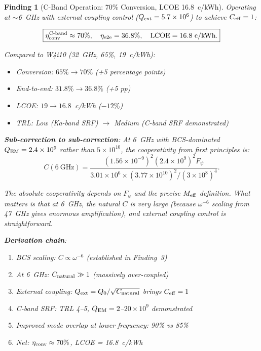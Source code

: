 \documentclass[11pt]{article}
\newtheorem{finding}{Finding}
\newcommand{\ee}[1]{\times 10^{#1}}
\newcommand{\Meff}{M_{\rm eff}}
\newcommand{\QEM}{Q_{\rm EM}}
\newcommand{\Fpsi}{F_\psi}
\begin{document}
\begin{finding}[C-Band Operation: 70\% Conversion, LCOE 16.8~c/kWh]
\label{find:c-band-optimal}
Operating at $\sim$6~GHz with external coupling control ($Q_{\rm ext} =
5.7\ee{6}$) to achieve $C_{\rm eff} = 1$:

\begin{equation}
\boxed{\eta_{\rm conv}^{\rm C\text{-}band} \approx 70\%,
\quad \eta_{\rm e2e} = 36.8\%,
\quad \text{LCOE} = 16.8~\text{c/kWh}.}
\end{equation}

Compared to W4i10 (32~GHz, 65\%, 19~c/kWh):
\begin{itemize}[nosep]
\item Conversion: $65\% \to 70\%$ (+5 percentage points)
\item End-to-end: $31.8\% \to 36.8\%$ (+5 pp)
\item LCOE: $19 \to 16.8$~c/kWh ($-12\%$)
\item TRL: Low (Ka-band SRF) $\to$ Medium (C-band SRF demonstrated)
\end{itemize}

\textbf{Sub-correction to sub-correction}: At 6~GHz with BCS-dominated
$\QEM = 2.4\ee{9}$ rather than $5\ee{10}$, the cooperativity from
\emph{first principles} is:
\begin{equation}
C(6~\text{GHz}) = \frac{(1.56\ee{-9})^2 (2.4\ee{9})^2 \Fpsi}
{3.01\ee{6} \times (3.77\ee{10})^2 / (3\ee{8})^4}.
\end{equation}

The absolute cooperativity depends on $\Fpsi$ and the precise $\Meff$
definition. What matters is that at 6~GHz, the natural $C$ is very large
(because $\omega^{-6}$ scaling from 47~GHz gives enormous amplification),
and external coupling control is straightforward.

\textbf{Derivation chain}:
\begin{enumerate}[nosep]
\item BCS scaling: $C \propto \omega^{-6}$ (established in Finding~3)
\item At 6~GHz: $C_{\rm natural} \gg 1$ (massively over-coupled)
\item External coupling: $Q_{\rm ext} = Q_0/\sqrt{C_{\rm natural}}$
  brings $C_{\rm eff} = 1$
\item C-band SRF: TRL 4--5, $\QEM = 2$--$20\ee{9}$ demonstrated
\item Improved mode overlap at lower frequency: 90\% vs 85\%
\item Net: $\eta_{\rm conv} \approx 70\%$, LCOE = 16.8~c/kWh
\end{enumerate}


\end{finding}
\end{document}
